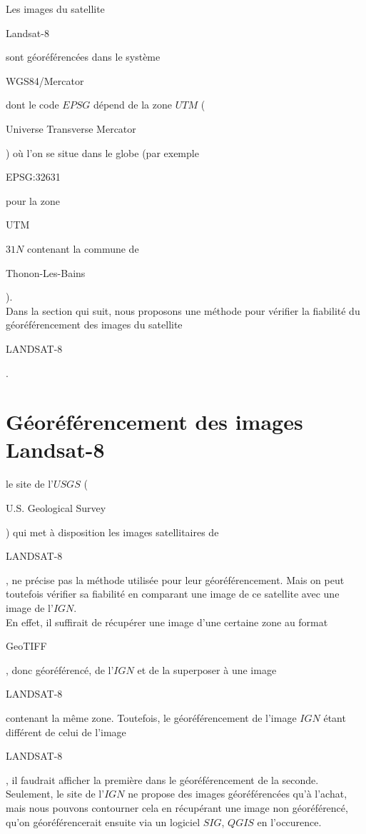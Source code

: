 \documentclass{book}
\begin{document}
Les images du satellite \begin{itshape}Landsat-8\end{itshape} sont géoréférencées dans le système 
\begin{itshape}WGS84/Mercator\end{itshape} dont le code $EPSG$ dépend
de la zone $UTM$ (\begin{itshape}Universe Transverse Mercator\end{itshape}) où l'on se situe dans le globe 
(par exemple \begin{itshape}EPSG:32631\end{itshape} pour la zone \begin{itshape}UTM\end{itshape} $31N$ contenant la commune de
 \begin{itshape}Thonon-Les-Bains\end{itshape}).\\ 
Dans la section qui suit, nous proposons une méthode pour vérifier la fiabilité du géoréférencement
 des images du satellite \begin{itshape}LANDSAT-8\end{itshape}.
 
\section{Géoréférencement des images Landsat-8}

le site de l'$USGS$ (\begin{itshape}U.S. Geological Survey\end{itshape}) \cite{landsat8} qui met à disposition les images
satellitaires de \begin{itshape}LANDSAT-8\end{itshape}, ne précise pas la méthode utilisée pour leur géoréférencement.
Mais on peut toutefois vérifier sa fiabilité en comparant une image de ce satellite avec une image de 
l'$IGN$.\\
En effet, il suffirait de récupérer une image d'une certaine zone au format \begin{itshape}GeoTIFF\end{itshape}, 
donc géoréférencé, de l'$IGN$ et de la superposer
à une image \begin{itshape}LANDSAT-8\end{itshape} contenant la même zone. Toutefois, le géoréférencement de l'image $IGN$ étant différent
de celui de l'image \begin{itshape}LANDSAT-8\end{itshape}, il faudrait afficher la première dans le géoréférencement de la seconde.\\
Seulement, le site de l'$IGN$ ne propose des images géoréférencées qu'à l'achat, mais nous pouvons contourner cela en récupérant une 
image non géoréférencé, qu'on géoréférencerait ensuite via un logiciel $SIG$, $QGIS$ en l'occurence.
\end{document}
